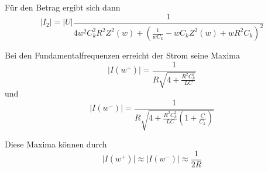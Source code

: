 Für den Betrag ergibt sich dann
\begin{equation}
    \lvert I_2\rvert = \lvert U\rvert \frac{1}{ 4w^2C_k^2R^2Z^2(w) + ( \frac{1}{wC_k} - wC_kZ^2(w) + wR^2C_k )^2 }
\end{equation}

Bei den Fundamentalfrequenzen erreicht der Strom seine Maxima
\begin{equation}
    \lvert I(w^{+})\rvert = \frac{1}{ R\sqrt{4 + \frac{R^2C_k^2}{LC}}}
\end{equation}
und
\begin{equation}
    \lvert I(w^{-})\rvert = \frac{1}{ R\sqrt{4 + \frac{R^2C_k^2}{LC}(1+\frac{C}{C_k})}}
\end{equation}

Diese Maxima können durch 
\begin{equation}
    \lvert I(w^{+})\rvert \approx \lvert I(w^{-})\rvert \approx \frac{1}{2R}
\end{equation}


